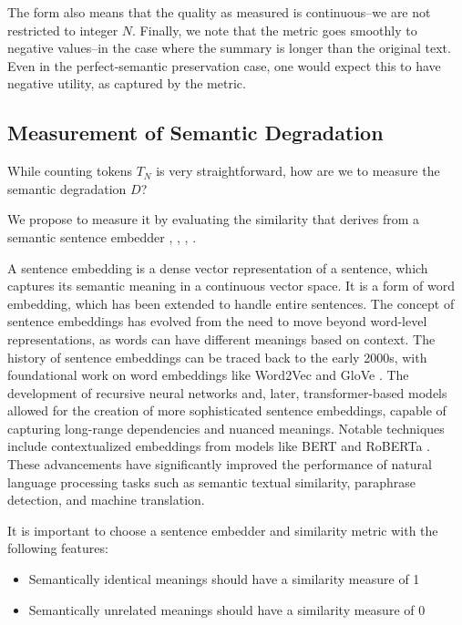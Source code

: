 \documentclass{article}
\begin{document}
The form also means that the quality as measured is continuous--we are not restricted to integer $N$.
Finally, we note that the metric goes smoothly to negative values--in the case where the summary is longer than the original text.  
Even in the perfect-semantic preservation case, one would expect this to have negative utility, as captured by the metric.


\subsection{Measurement of Semantic Degradation}

While counting tokens $T_N$ is very straightforward, how are we to measure the semantic degradation $D$?

We propose to measure it by evaluating the similarity that
derives from a semantic sentence embedder \citet{hill-etal-2016-learning}, \citet{DBLP:journals/corr/abs-2002-10957}, \citet{DBLP:journals/corr/SutskeverVL14}, \citet{muennighoff2022mteb}.

A sentence embedding is a dense vector representation of a sentence, which captures its semantic meaning in a continuous vector space. It is a form of word embedding, which has been extended to handle entire sentences. The concept of sentence embeddings has evolved from the need to move beyond word-level representations, as words can have different meanings based on context. The history of sentence embeddings can be traced back to the early 2000s, with foundational work on word embeddings like Word2Vec \citet{mikolov2013efficient} and GloVe \citet{pennington-etal-2014-glove,}. The development of recursive neural networks and, later, transformer-based models allowed for the creation of more sophisticated sentence embeddings, capable of capturing long-range dependencies and nuanced meanings. Notable techniques include contextualized embeddings from models like BERT \citet{DBLP:journals/corr/abs-1810-04805} and RoBERTa \citet{DBLP:journals/corr/abs-1907-11692}. These advancements have significantly improved the performance of natural language processing tasks such as semantic textual similarity, paraphrase detection, and machine translation.

It is important to choose a sentence embedder and similarity metric with the following features: 

\begin{itemize}
	\item Semantically identical meanings should have a similarity measure of 1
	\item Semantically unrelated meanings should have a similarity measure of 0
\end{itemize}
\end{document}
